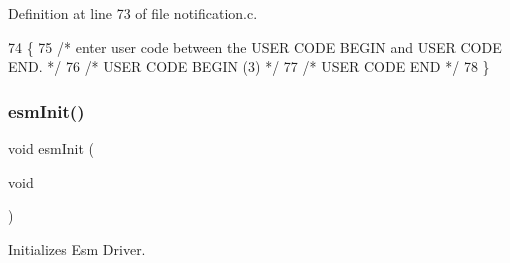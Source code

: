 Definition at line 73 of file notification.\+c.


\begin{DoxyCode}
74 \{
75 \textcolor{comment}{/*  enter user code between the USER CODE BEGIN and USER CODE END. */}
76 \textcolor{comment}{/* USER CODE BEGIN (3) */}
77 \textcolor{comment}{/* USER CODE END */}
78 \}
\end{DoxyCode}
\mbox{\label{group__ESM_ga3ebbcbb33cba761eba56edcf1aeb9961}} 
\subsubsection{\texorpdfstring{esm\+Init()}{esmInit()}}
{\footnotesize\ttfamily void esm\+Init (\begin{DoxyParamCaption}\item[{void}]{ }\end{DoxyParamCaption})}



Initializes Esm Driver. 

